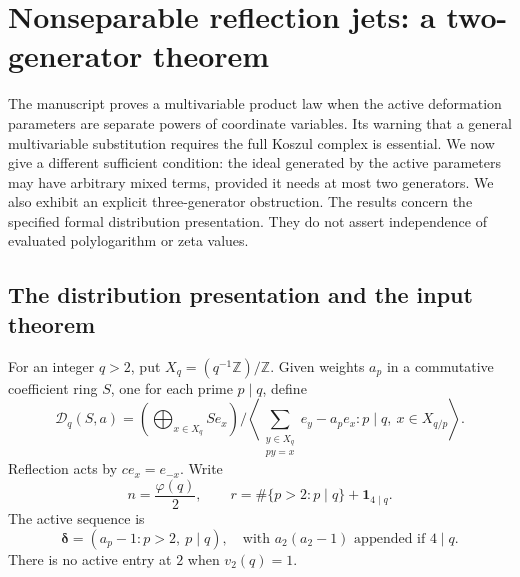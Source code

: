 \section{Nonseparable reflection jets: a two-generator theorem}
\label{ns:sec:jets}

The manuscript proves a multivariable product law when the active deformation
parameters are separate powers of coordinate variables. Its warning that a
general multivariable substitution requires the full Koszul complex is
essential. We now give a different sufficient condition: the ideal generated
by the active parameters may have arbitrary mixed terms, provided it needs at
most two generators. We also exhibit an explicit three-generator obstruction.
The results concern the specified formal distribution presentation. They do
not assert independence of evaluated polylogarithm or zeta values.

\subsection{The distribution presentation and the input theorem}

For an integer $q>2$, put $X_q=(q^{-1}\mathbb Z)/\mathbb Z$. Given weights
$a_p$ in a commutative coefficient ring $S$, one for each prime $p\mid q$,
define
\begin{equation}\label{ns:eq:distribution}
 \mathcal D_q(S,a)=
 \left(\bigoplus_{x\in X_q}S e_x\right)
 \Big/
 \left\langle
  \sum_{\substack{y\in X_q\\py=x}}e_y-a_pe_x:
  p\mid q,\ x\in X_{q/p}
 \right\rangle.
\end{equation}
Reflection acts by $ce_x=e_{-x}$. Write
\[
 n=\frac{\varphi(q)}2,\qquad
 r=\#\{p>2:p\mid q\}+\mathbf1_{4\mid q}.
\]
The active sequence is
\begin{equation}\label{ns:eq:active}
 \boldsymbol\delta=
 (a_p-1:p>2,\ p\mid q),
 \quad\text{with }a_2(a_2-1)\text{ appended if }4\mid q.
\end{equation}
There is no active entry at $2$ when $v_2(q)=1$.

